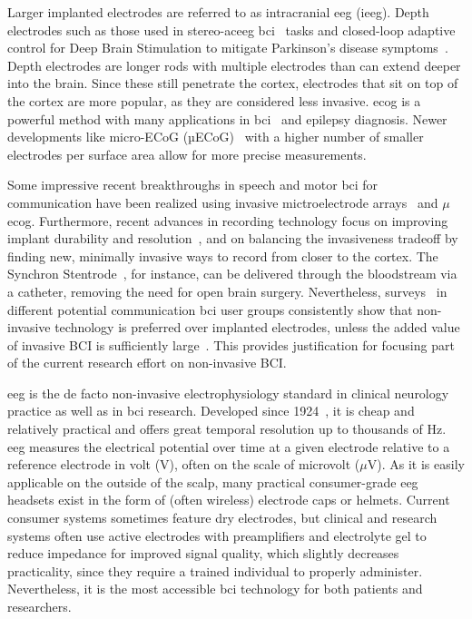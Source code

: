 Larger implanted electrodes are referred to as intracranial \ac{eeg} (i\ac{eeg}).
Depth electrodes such as those used in stereo-ac{eeg} \ac{bci}~\cite{Wu2024} tasks
and closed-loop adaptive control for Deep Brain Stimulation to mitigate
Parkinson's disease symptoms~\cite{Arlotti2018}.
Depth electrodes are longer rods with multiple electrodes than can extend
deeper into the brain.
Since these still penetrate the cortex, electrodes that sit on top of the
cortex are more popular, as they are considered less invasive.
\Ac{ecog} is a powerful method with many applications in \ac{bci}~\cite{Schalk2011} and epilepsy diagnosis.
Newer developments like micro-ECoG (µECoG)~\cite{Shokoueinejad2019} with a
higher number of smaller electrodes per surface area allow for more precise
measurements.

Some impressive recent breakthroughs in speech and motor \ac{bci} for communication
have been realized using
invasive mictroelectrode arrays~\cite{Willett2021} and $\mu$\Ac{ecog}\cite{Metzger2023}.
Furthermore, recent advances in recording technology focus on improving implant
durability and resolution~\cite{Steinmetz2021}, and on balancing the invasiveness
tradeoff by finding new, minimally invasive ways to record from closer to the cortex.
The Synchron Stentrode~\cite{Mitchell2023}, for instance, can be delivered
through the bloodstream via a catheter, removing the need for open brain
surgery.
Nevertheless, surveys~\cite{Huggins2011, Huggins2015, Branco2021} in different
potential communication \ac{bci} user groups consistently show that non-invasive
technology is preferred over implanted electrodes, unless the added value of invasive BCI is
sufficiently large~\cite{Kageyama2020}.
This provides justification for focusing part of the current research effort on
non-invasive BCI.

\Ac{eeg} is the de facto non-invasive electrophysiology standard in clinical
neurology practice as well as in \ac{bci} research.
Developed since 1924~\cite{Berger1929}, it is cheap and relatively practical and
offers great temporal resolution up to thousands of Hz.
\Ac{eeg} measures the electrical potential over time at a given electrode relative to a
reference electrode in volt (V), often on the scale of microvolt ($\mu$V).
As it is easily applicable on the outside of the scalp, many practical
consumer-grade \ac{eeg} headsets exist in the form of (often wireless) electrode
caps or helmets.
Current consumer systems sometimes feature dry electrodes, but clinical and
research systems often use active electrodes with preamplifiers and
electrolyte gel to reduce impedance for improved signal
quality, which slightly decreases practicality, since they require a trained
individual to properly administer.
Nevertheless, it is the most accessible \ac{bci} technology for both patients
and researchers.

